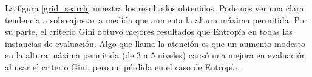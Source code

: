La figura \ref{grid_search} muestra los resultados obtenidos. Podemos ver una clara tendencia a sobreajustar a medida que aumenta la altura máxima permitida. Por su parte, el criterio Gini obtuvo mejores resultados que Entropía en todas las instancias de evaluación. Algo que llama la atención es que un aumento modesto en la altura máxima permitida (de $3$ a $5$ niveles) causó una mejora en evaluación al usar el criterio Gini, pero un pérdida en el caso de Entropía.

